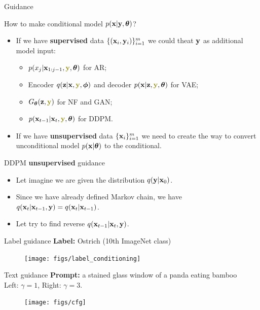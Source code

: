 \begin{frame}{Guidance}
	\begin{block}{How to make conditional model $p(\mathbf{x} | \mathbf{y}, \boldsymbol{\theta})$?}
		\begin{itemize}
		\item If we have \textbf{supervised} data $\{(\mathbf{x}_i, \mathbf{y}_i)\}_{i=1}^m$ we could theat $\mathbf{y}$ as additional model input:
		\begin{itemize}
			\item $p(x_j | \bx_{1:j-1}, {\color{olive}\by}, \btheta)$ for AR;
			\item Encoder $q(\bz | \bx, {\color{olive}\by}, \bphi)$ and decoder $p(\bx | \bz, {\color{olive}\by}, \btheta)$ for VAE;
			\item $G_{\btheta}(\bz, {\color{olive}\by})$ for NF and GAN;
			\item $p(\bx_{t-1} | \bx_t, {\color{olive}\by}, \btheta)$ for DDPM.
		\end{itemize}
		\item If we have \textbf{unsupervised} data $\{\mathbf{x}_i\}_{i=1}^m$ we need to create the way to convert unconditional model $p(\mathbf{x} | \boldsymbol{\theta})$ to the conditional.
		\end{itemize}
	\end{block}
	\begin{block}{DDPM \textbf{unsupervised} guidance}
		\begin{itemize}
			\item Let imagine we are given the distribution $q(\mathbf{y} | \mathbf{x}_0)$. 
			\item Since we have already defined Markov chain, we have $q(\mathbf{x}_t | \mathbf{x}_{t-1}, \mathbf{y}) = q(\mathbf{x}_t | \mathbf{x}_{t - 1})$.
			\item Let try to find reverse $q(\mathbf{x}_{t-1} | \mathbf{x}_t, \mathbf{y})$.
		\end{itemize}
	\end{block}
\end{frame}
\begin{frame}{Label guidance}
	\textbf{Label:} Ostrich (10th ImageNet class) 
	\begin{figure}
		\texttt{[image: figs/label\_conditioning]}
	\end{figure}
\end{frame}
\begin{frame}{Text guidance}
	\textbf{Prompt:} a stained glass window of a panda eating bamboo \\
	Left: $\gamma = 1$, Right: $\gamma = 3$.
	\begin{figure}
		\texttt{[image: figs/cfg]}
	\end{figure}
\end{frame}

